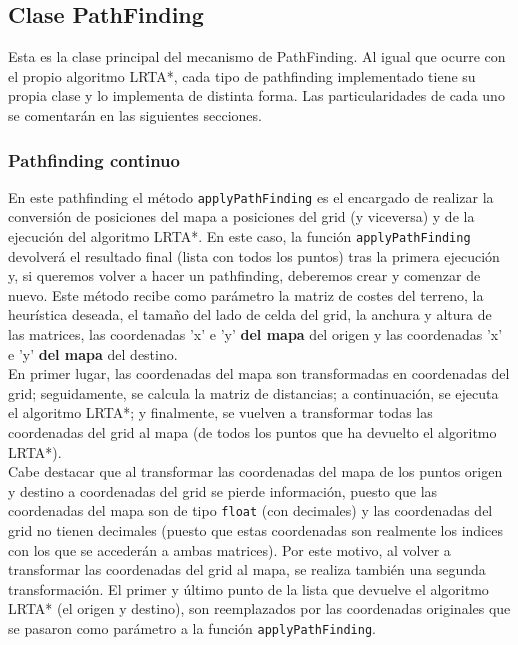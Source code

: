 \subsection{Clase PathFinding}

Esta es la clase principal del mecanismo de PathFinding. Al igual que ocurre con el propio algoritmo LRTA*, cada tipo de pathfinding implementado tiene su propia clase y lo implementa de distinta forma. Las particularidades de cada uno se comentarán en las siguientes secciones.

\subsubsection{Pathfinding continuo}

En este pathfinding el método \texttt{applyPathFinding} es el encargado de realizar la conversión de posiciones del mapa a posiciones del grid (y viceversa) y de la ejecución del algoritmo LRTA*. En este caso, la función \texttt{applyPathFinding} devolverá el resultado final (lista con todos los puntos) tras la primera ejecución y, si queremos volver a hacer un pathfinding, deberemos crear y comenzar de nuevo. Este método recibe como parámetro la matriz de costes del terreno, la heurística deseada, el tamaño del lado de celda del grid, la anchura y altura de las matrices, las coordenadas 'x' e 'y' \textbf{del mapa} del origen y las coordenadas 'x' e 'y' \textbf{del mapa} del destino. \\

En primer lugar, las coordenadas del mapa son transformadas en coordenadas del grid; seguidamente, se calcula la matriz de distancias; a continuación, se ejecuta el algoritmo LRTA*; y finalmente, se vuelven a transformar todas las coordenadas del grid al mapa (de todos los puntos que ha devuelto el algoritmo LRTA*). \\

Cabe destacar que al transformar las coordenadas del mapa de los puntos origen y destino a coordenadas del grid se pierde información, puesto que las coordenadas del mapa son de tipo \texttt{float} (con decimales) y las coordenadas del grid no tienen decimales (puesto que estas coordenadas son realmente los indices con los que se accederán a ambas matrices). Por este motivo, al volver a transformar las coordenadas del grid al mapa, se realiza también una segunda transformación. El primer y último punto de la lista que devuelve el algoritmo LRTA* (el origen y destino), son reemplazados por las coordenadas originales que se pasaron como parámetro a la función \texttt{applyPathFinding}.

